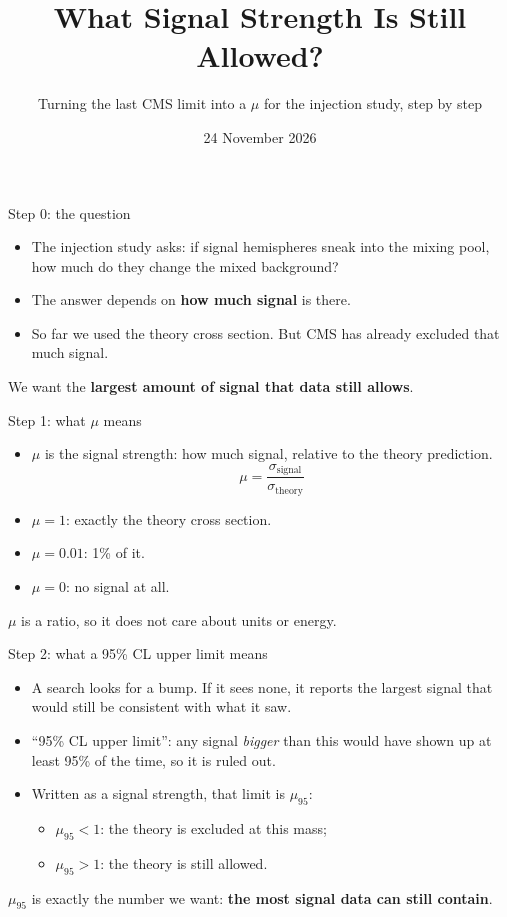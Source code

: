 \documentclass[aspectratio=169,12pt]{beamer}
\title{\textbf{What Signal Strength Is Still Allowed?}}
\subtitle{Turning the last CMS limit into a $\mu$ for the injection study, step by step}
\date{24 November 2026}
\newcommand{\takeaway}[1]{\vfill
  \colorbox{boxbg}{\parbox{0.96\textwidth}{\centering\vspace{0.3em}#1\vspace{0.3em}}}
  \par\vspace{0.6em}}
\begin{document}
\begin{frame}[plain]
  \titlepage
\end{frame}


\begin{frame}{Step 0: the question}
  \begin{itemize}
    \item The injection study asks: if signal hemispheres sneak into the mixing
          pool, how much do they change the mixed background?
    \item The answer depends on \textbf{how much signal} is there.
    \item So far we used the theory cross section. But CMS has already
          excluded that much signal.
  \end{itemize}
  \takeaway{We want the \textbf{largest amount of signal that data still allows}.}
\end{frame}

\begin{frame}{Step 1: what $\mu$ means}
  \begin{itemize}
    \item $\mu$ is the signal strength: how much signal, relative to the theory
          prediction.
          \[ \mu = \frac{\sigma_{\text{signal}}}{\sigma_{\text{theory}}} \]
    \item $\mu = 1$: exactly the theory cross section.
    \item $\mu = 0.01$: 1\% of it.
    \item $\mu = 0$: no signal at all.
  \end{itemize}
  \takeaway{$\mu$ is a ratio, so it does not care about units or energy.}
\end{frame}

\begin{frame}{Step 2: what a 95\% CL upper limit means}
  \begin{itemize}
    \item A search looks for a bump. If it sees none, it reports the largest
          signal that would still be consistent with what it saw.
    \item ``95\% CL upper limit'': any signal \emph{bigger} than this would have
          shown up at least 95\% of the time, so it is ruled out.
    \item Written as a signal strength, that limit is $\mu_{95}$:
      \begin{itemize}
        \item $\mu_{95} < 1$: the theory is excluded at this mass;
        \item $\mu_{95} > 1$: the theory is still allowed.
      \end{itemize}
  \end{itemize}
  \takeaway{$\mu_{95}$ is exactly the number we want: \textbf{the most signal
  data can still contain}.}
\end{frame}
\end{document}
